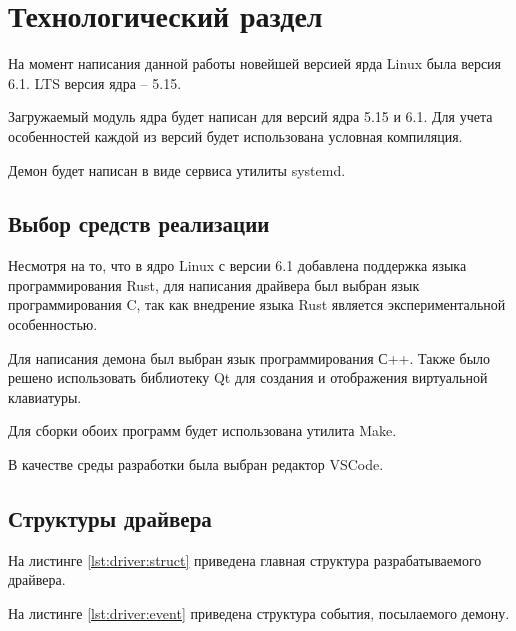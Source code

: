 \section{Технологический раздел}

На момент написания данной работы новейшей версией ярда Linux была версия 6.1. LTS версия ядра -- 5.15.

Загружаемый модуль ядра будет написан для версий ядра 5.15 и 6.1. Для учета особенностей каждой из версий будет использована условная компиляция.

Демон будет написан в виде сервиса утилиты systemd.

\subsection{Выбор средств реализации}

Несмотря на то, что в ядро Linux с версии 6.1 добавлена поддержка языка программирования Rust, для написания драйвера был выбран язык программирования C, так как внедрение языка Rust является экспериментальной особенностью.

Для написания демона был выбран язык программирования С++. Также было решено использовать библиотеку Qt для создания и отображения виртуальной клавиатуры.

Для сборки обоих программ будет использована утилита Make.

В качестве среды разработки была выбран редактор VSCode.

\subsection{Структуры драйвера}

На листинге \ref{lst:driver:struct} приведена главная структура разрабатываемого драйвера.


На листинге \ref{lst:driver:event} приведена структура события, посылаемого демону.


